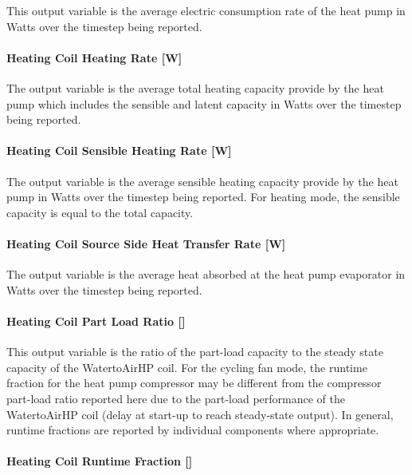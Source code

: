 This output variable is the average electric consumption rate of the heat pump in Watts over the timestep being reported.

\paragraph{Heating Coil Heating Rate {[}W{]}}\label{heating-coil-heating-rate-w-3}

The output variable is the average total heating capacity provide by the heat pump which includes the sensible and latent capacity in Watts over the timestep being reported.

\paragraph{Heating Coil Sensible Heating Rate {[}W{]}}\label{heating-coil-sensible-heating-rate-w-1}

The output variable is the average sensible heating capacity provide by the heat pump in Watts over the timestep being reported. For heating mode, the sensible capacity is equal to the total capacity.

\paragraph{Heating Coil Source Side Heat Transfer Rate {[}W{]}}\label{heating-coil-source-side-heat-transfer-rate-w-1}

The output variable is the average heat absorbed at the heat pump evaporator in Watts over the timestep being reported.

\paragraph{\texorpdfstring{Heating Coil Part Load Ratio {[]}}{Heating Coil Part Load Ratio }}\label{heating-coil-part-load-ratio-1}

This output variable is the ratio of the part-load capacity to the steady state capacity of the WatertoAirHP coil. For the cycling fan mode, the runtime fraction for the heat pump compressor may be different from the compressor part-load ratio reported here due to the part-load performance of the WatertoAirHP coil (delay at start-up to reach steady-state output). In general, runtime fractions are reported by individual components where appropriate.

\paragraph{\texorpdfstring{Heating Coil Runtime Fraction {[]}}{Heating Coil Runtime Fraction }}\label{heating-coil-runtime-fraction-7}

